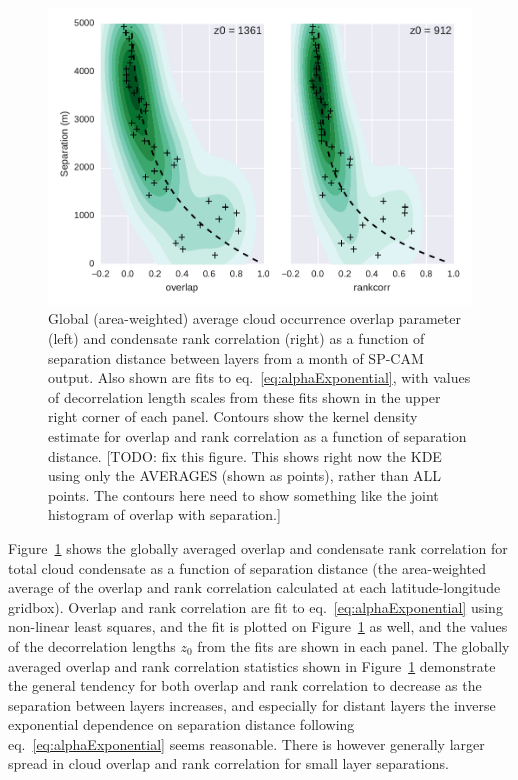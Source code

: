 \begin{figure}[htbp]
\centering
\includegraphics{graphics/subgrid2_overlap_dz.pdf}
\caption{\label{fig:overlapScatter}Global (area-weighted) average cloud
occurrence overlap parameter (left) and condensate rank correlation
(right) as a function of separation distance between layers from a month
of SP-CAM output. Also shown are fits to eq.~\ref{eq:alphaExponential},
with values of decorrelation length scales from these fits shown in the
upper right corner of each panel. Contours show the kernel density
estimate for overlap and rank correlation as a function of separation
distance. {[}TODO: fix this figure. This shows right now the KDE using
only the AVERAGES (shown as points), rather than ALL points. The
contours here need to show something like the joint histogram of overlap
with separation.{]}}\label{fig:overlapScatter}
\end{figure}

Figure~\ref{fig:overlapScatter} shows the globally averaged overlap and
condensate rank correlation for total cloud condensate as a function of
separation distance (the area-weighted average of the overlap and rank
correlation calculated at each latitude-longitude gridbox). Overlap and
rank correlation are fit to eq.~\ref{eq:alphaExponential} using
non-linear least squares, and the fit is plotted on
Figure~\ref{fig:overlapScatter} as well, and the values of the
decorrelation lengths \(z_0\) from the fits are shown in each panel. The
globally averaged overlap and rank correlation statistics shown in
Figure~\ref{fig:overlapScatter} demonstrate the general tendency for
both overlap and rank correlation to decrease as the separation between
layers increases, and especially for distant layers the inverse
exponential dependence on separation distance following
eq.~\ref{eq:alphaExponential} seems reasonable. There is however
generally larger spread in cloud overlap and rank correlation for small
layer separations.

